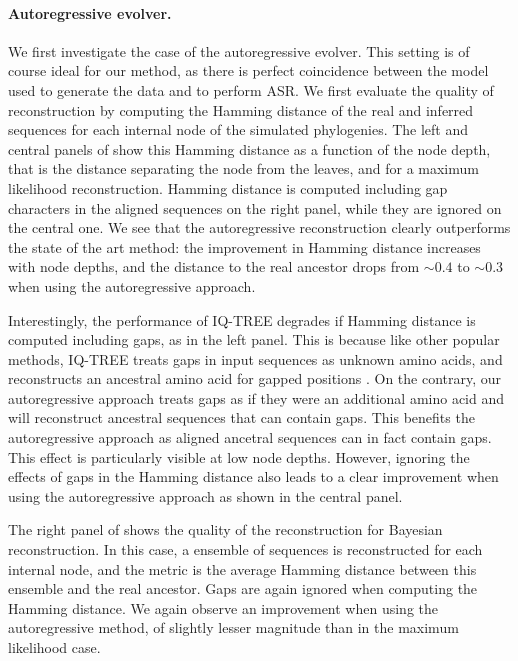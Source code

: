 \paragraph*{Autoregressive evolver.} We first investigate the case of the autoregressive evolver. 
This setting is of course ideal for our method, as there is perfect coincidence between the model used to generate the data and to perform ASR. 
We first evaluate the quality of reconstruction by computing the Hamming distance of the real and inferred sequences for each internal node of the simulated phylogenies. 
The left and central panels of  show this Hamming distance as a function of the node depth, that is the distance separating the node from the leaves, and for a maximum likelihood reconstruction. 
Hamming distance is computed including gap characters in the aligned sequences on the right panel, while they are ignored on the central one. 
We see that the autoregressive reconstruction clearly outperforms the state of the art method: the improvement in Hamming distance increases with node depths, and the distance to the real ancestor drops from $\sim 0.4$ to $\sim 0.3$ when using the autoregressive approach. 

Interestingly, the performance of IQ-TREE degrades if Hamming distance is computed including gaps, as in the left panel. 
This is because like other popular methods, IQ-TREE treats gaps in input sequences as unknown amino acids, and reconstructs an ancestral amino acid for gapped positions \cite{yang_pamlphylogeneticanalysis_2007,minh_iqtreenewmodels_2020}. 
On the contrary, our autoregressive approach treats gaps as if they were an additional amino acid and will reconstruct ancestral sequences that can contain gaps. 
This benefits the autoregressive approach as aligned ancetral sequences can in fact contain gaps.
This effect is particularly visible at low node depths. 
However, ignoring the effects of gaps in the Hamming distance also leads to a clear improvement when using the autoregressive approach as shown in the central panel. 

The right panel of  shows the quality of the reconstruction for Bayesian reconstruction. 
In this case, a ensemble of sequences is reconstructed for each internal node, and the metric is the average Hamming distance between this ensemble and the real ancestor. 
Gaps are again ignored when computing the Hamming distance. 
We again observe an improvement when using the autoregressive method, of slightly lesser magnitude than in the maximum likelihood case. \\


